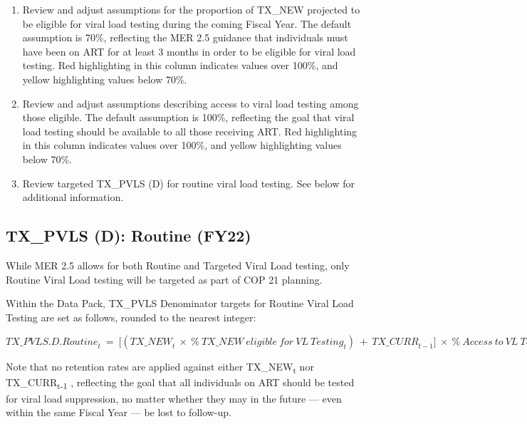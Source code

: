 \documentclass[
  openany]{book}
\begin{document}
\begin{enumerate}
\def\labelenumi{\arabic{enumi}.}
\item
  Review and adjust assumptions for the proportion of TX\_NEW projected
  to be eligible for viral load testing during the coming Fiscal Year.
  The default assumption is 70\%, reflecting the MER 2.5 guidance that
  individuals must have been on ART for at least 3 months in order to
  be eligible for viral load testing. Red highlighting in this column
  indicates values over 100\%, and yellow highlighting values below
  70\%.
\item
  Review and adjust assumptions describing access to viral load
  testing among those eligible. The default assumption is 100\%,
  reflecting the goal that viral load testing should be available to
  all those receiving ART. Red highlighting in this column indicates
  values over 100\%, and yellow highlighting values below 70\%.
\item
  Review targeted TX\_PVLS (D) for routine viral load testing. See
  below for additional information.
\end{enumerate}

\hypertarget{tx_pvls-d-routine-fy22}{%
\subsection{TX\_PVLS (D): Routine (FY22)}\label{tx_pvls-d-routine-fy22}}

While MER 2.5 allows for both Routine and Targeted Viral Load testing,
only Routine Viral Load testing will be targeted as part of COP 21
planning.

Within the Data Pack, TX\_PVLS Denominator targets for Routine Viral Load
Testing are set as follows, rounded to the nearest integer:

\begin{center} ${TX\_ PVLS.D.Routine}_{t}\  = \ \lbrack({TX\_ NEW}_{t}\  \times \ {\%\ TX\_ NEW\ eligible\ for\ VL\ Testing}_{t})\  + \ {TX\_ CURR}_{t - 1}\rbrack\  \times \ {\%\ Access\ to\ VL\ Testing}_{t}$ \end{center}

Note that no retention rates are applied against either TX\_NEW\textsubscript{t} nor
TX\_CURR\textsubscript{t-1} , reflecting the goal that all individuals on ART should be
tested for viral load suppression, no matter whether they may in the
future --- even within the same Fiscal Year --- be lost to follow-up.

\textbf{\emph{\hfill\break
}}
\end{document}
